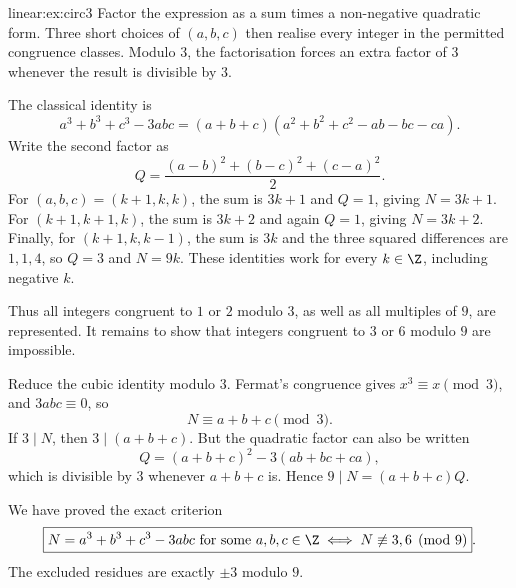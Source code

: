 \begin{solution}{linear:ex:circ3}
\idea Factor the expression as a sum times a non-negative quadratic form. Three short choices of $(a,b,c)$ then realise every integer in the permitted congruence classes. Modulo $3$, the factorisation forces an extra factor of $3$ whenever the result is divisible by $3$.

\writeup The classical identity is
\[
a^3+b^3+c^3-3abc
=(a+b+c)(a^2+b^2+c^2-ab-bc-ca).
\]
Write the second factor as
\[
Q=\frac{(a-b)^2+(b-c)^2+(c-a)^2}{2}.
\]
For $(a,b,c)=(k+1,k,k)$, the sum is $3k+1$ and $Q=1$, giving $N=3k+1$. For $(k+1,k+1,k)$, the sum is $3k+2$ and again $Q=1$, giving $N=3k+2$. Finally, for $(k+1,k,k-1)$, the sum is $3k$ and the three squared differences are $1,1,4$, so $Q=3$ and $N=9k$. These identities work for every $k\in\Z$, including negative $k$.

Thus all integers congruent to $1$ or $2$ modulo $3$, as well as all multiples of $9$, are represented. It remains to show that integers congruent to $3$ or $6$ modulo $9$ are impossible.

Reduce the cubic identity modulo $3$. Fermat's congruence gives $x^3\equiv x\pmod3$, and $3abc\equiv0$, so
\[
N\equiv a+b+c\pmod3.
\]
If $3\mid N$, then $3\mid(a+b+c)$. But the quadratic factor can also be written
\[
Q=(a+b+c)^2-3(ab+bc+ca),
\]
which is divisible by $3$ whenever $a+b+c$ is. Hence $9\mid N=(a+b+c)Q$.

We have proved the exact criterion
\[
\boxed{N=a^3+b^3+c^3-3abc\text{ for some }a,b,c\in\Z
\iff N\not\equiv3,6\pmod9}.
\]
The excluded residues are exactly $\pm3$ modulo $9$.
\end{solution}

